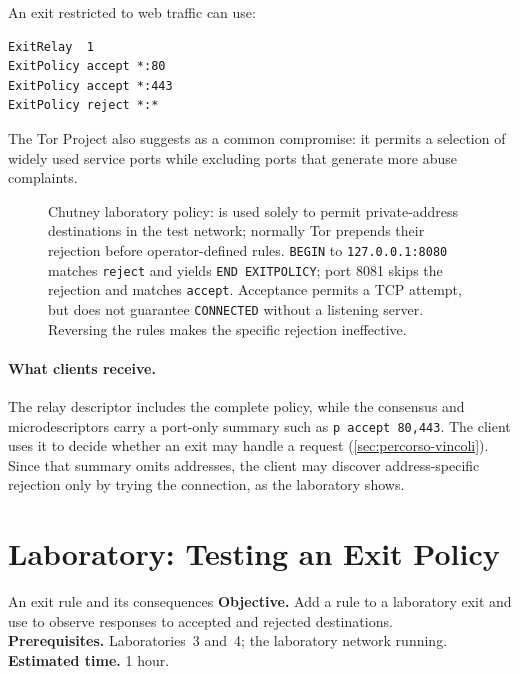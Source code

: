 An exit restricted to web traffic can use:
\begin{lstlisting}[numbers=none]
ExitRelay  1
ExitPolicy accept *:80
ExitPolicy accept *:443
ExitPolicy reject *:*
\end{lstlisting}
The Tor Project also suggests  as a common compromise: it permits a selection of widely used service ports while excluding ports that generate more abuse complaints.

\begin{figure}[htbp]
\centering

\caption{Chutney laboratory policy:  is used solely to permit private-address destinations in the test network; normally Tor prepends their rejection before operator-defined rules. \texttt{BEGIN} to \texttt{127.0.0.1:8080} matches \texttt{reject} and yields \texttt{END EXITPOLICY}; port 8081 skips the rejection and matches \texttt{accept}. Acceptance permits a TCP attempt, but does not guarantee \texttt{CONNECTED} without a listening server. Reversing the rules makes the specific rejection ineffective.}
\label{fig:policy}
\end{figure}

\paragraph{What clients receive.} The relay descriptor includes the complete policy, while the consensus and microdescriptors carry a port-only summary such as \texttt{p accept 80,443}. The client uses it to decide whether an exit may handle a request (\cref{sec:percorso-vincoli}). Since that summary omits addresses, the client may discover address-specific rejection only by trying the connection, as the laboratory shows.

\section{Laboratory: Testing an Exit Policy}\label{sec:lab-relay}

\begin{laboratorio}[14]{An exit rule and its consequences}
\textbf{Objective.} Add a rule to a laboratory exit and use  to observe responses to accepted and rejected destinations.\\
\textbf{Prerequisites.} Laboratories~3 and~4; the laboratory network running.\\
\textbf{Estimated time.} 1 hour.
\end{laboratorio}

